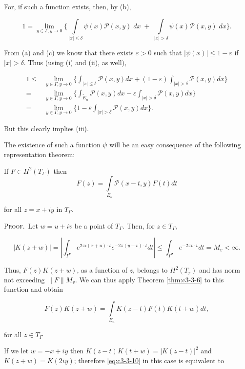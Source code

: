 For, if such a function exists, then, by (b),

\[
1=\lim_{y\in\Gamma, y\to0}\Bigg\{\int\limits_{|x|\leq\delta}\psi(x)\mathcal{P}(x,y)\;{d}x\;+\;\int\limits_{|x|>\delta}\psi(x)\mathcal{P}(x,y)\;{d}x\Bigg\}.
\]

From (a) and (c) we know that there exists $\varepsilon > 0$ such that $|\psi(x)| \leq 1 - \varepsilon$ if $|x| > \delta$. Thus (using (i) and (ii), as well),

\[
\begin{aligned}1\leq&\lim_{y\in\Gamma,y\to0}\Biggl\{\int_{|x|\leq\delta}\mathcal{P}(x,y)dx+(1-\varepsilon)\int_{|x|>\delta}\mathcal{P}(x,y)dx\Biggr\}\\=&\lim_{y\in\Gamma,y\to0}\Biggl\{\int_{\widetilde{E}_{n}}\mathcal{P}(x,y)dx-\varepsilon\int_{|x|>\delta}\mathcal{P}(x,y)dx\Biggr\}\\=&\lim_{y\in\Gamma,y\to0}\Biggl\{1-\varepsilon\int_{|x|>\delta}\mathcal{P}(x,y)dx\Biggr\}.\end{aligned}
\]

But this clearly implies (iii).

The existence of such a function $\psi$ will be an easy consequence of the following representation theorem:

\begin{theorem}
\label{thm:c3-3-9}
If $F \in H^2(T_\Gamma)$ then
\[
F(z)=\int\limits_{E_{n}}\mathcal{P}(x-t,y)F(t)dt
\]

for all $z = x + iy$ in $T_{\Gamma}$.
\end{theorem}

\textsc{Proof.}\ Let $w = u + iv$ be a point of $T_{\Gamma}$. Then, for $z \in T_{\Gamma}$,

\[
|K(z+w)|=\left|\int_{\Gamma^{\bullet}}e^{2\pi i(x+u)\cdot t}e^{-2\pi(y+v)\cdot t}d t\right|\leq\int_{\Gamma^{\bullet}}e^{-2\pi v\cdot t}d t=M_{v}<\infty.
\]

Thus, $F(z)K(z + w)$, as a function of $z$, belongs to $H^2(T_r)$ and has norm not exceeding $\|F\|M_v$. We can thus apply Theorem \ref{thm:c3-3-6} to this function and obtain

\begin{equation}\label{eq:c3-3-10}
F(z)K(z+w)=\int\limits_{E_{n}}K(z-t)F(t)K(t+w)d t,
\end{equation}

for all $z \in T_{\Gamma}$

If we let $w = -x + iy$ then $K(z-t)K(t+w) = |K(z-t)|^{2}$ and $K(z+w) = K(2iy)$; therefore \eqref{eq:c3-3-10} in this case is equivalent to

